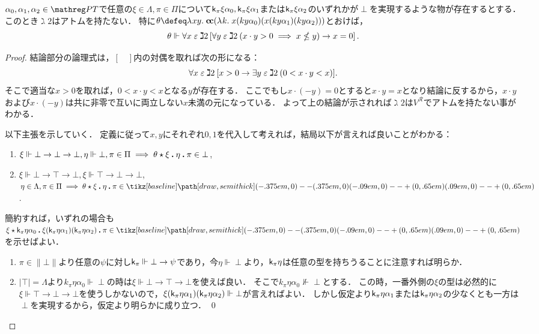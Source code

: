 \documentclass[realisability.tex]{subfiles}
\begin{document}
\begin{lemma}\label{lem:gimel2-atomless}
 $\alpha_0, \alpha_1, \alpha_2 \in \PT$で任意の$\xi \in \Lambda, \pi \in \Pi$について$\mathsf{k}_\pi \xi \alpha_0, \mathsf{k}_\pi \xi \alpha_1$または$\mathsf{k}_\pi \xi \alpha_2$のいずれかが$\perp$を実現するような物が存在するとする．
 このとき$\gimel2$はアトムを持たない．
 特に$\theta \defeq \abs{xy}{\cc (\abs{k}{x (k y \alpha_0)(x (k y \alpha_1)(k y \alpha_2))})}$とおけば，
 \[
  \theta \Vdash \forall x \mathrel{\varepsilon} \gimel 2 \left[ \forall y \mathrel{\varepsilon} \gimel 2 \: (x \cdot y > 0 \implies x \nleq y) \to x = 0 \right].
 \]
\end{lemma}
\begin{proof}
 結論部分の論理式は，$[\quad]$内の対偶を取れば次の形になる：
 \[
  \forall x \mathrel{\varepsilon} \gimel 2 \: [ x > 0 \to \exists y \mathrel{\varepsilon} \gimel 2 \: (0 < x \cdot y < x)].
 \]
 そこで適当な$x > 0$を取れば，$0 < x \cdot y < x$となる$y$が存在する．
 ここでもし$x \cdot (- y) = 0$とすると$x \cdot y = x$となり結論に反するから，$x \cdot y$および$x \cdot (- y)$は共に非零で互いに両立しない$x$未満の元になっている．
 よって上の結論が示されれば$\gimel 2$は$V^{\mathcal{R}}$でアトムを持たない事がわかる．

 以下主張を示していく．
 定義に従って$x, y$にそれぞれ$0, 1$を代入して考えれば，結局以下が言えれば良いことがわかる：
 \begin{enumerate}
  \item $\xi \Vdash \bot \to \bot \to \bot, \eta \Vdash \bot, \pi \in \Pi \implies \KVM{\theta \xi \eta \pi} \in \bot$,
  \item $\xi \Vdash \bot \to \top \to \bot, \xi \Vdash \top \to \bot \to \bot$, $\eta \in \Lambda, \pi \in \Pi \implies \KVM{\theta \xi \eta \pi} \in \pole$.
 \end{enumerate}
 簡約すれば，いずれの場合も$\KVM{\xi {{\conti_\pi \eta \alpha_0}}{\xi (\conti_\pi \eta \alpha_1)(\conti_\pi \eta \alpha_2)} \pi} \in \pole$を示せばよい．
 \begin{enumerate}
  \item $\pi \in \|\bot\|$より任意の$\psi$に対し$\mathsf{k}_\pi \Vdash \bot \to \psi$であり，今$\eta \Vdash \perp$より，$\mathsf{k}_\pi \eta$は任意の型を持ちうることに注意すれば明らか．
  \item $|\top| = \Lambda$より$k_\pi \eta \alpha_0 \Vdash \perp$の時は$\xi \Vdash \bot \to \top \to \bot$を使えば良い．
        そこで$k_\pi \eta \alpha_0 \nVdash \perp$とする．
        この時，一番外側の$\xi$の型は必然的に$\xi \Vdash \top \to \bot \to \bot$を使うしかないので，$\xi (\mathsf{k}_\pi \eta \alpha_1) (\mathsf{k}_\pi \eta \alpha_2) \Vdash \bot$が言えればよい．
        しかし仮定より$\mathsf{k}_\pi \eta \alpha_1$または$\mathsf{k}_\pi \eta \alpha_2$の少なくとも一方は$\perp$を実現するから，仮定より明らかに成り立つ． \qed
 \end{enumerate}
\end{proof}
\end{document}
